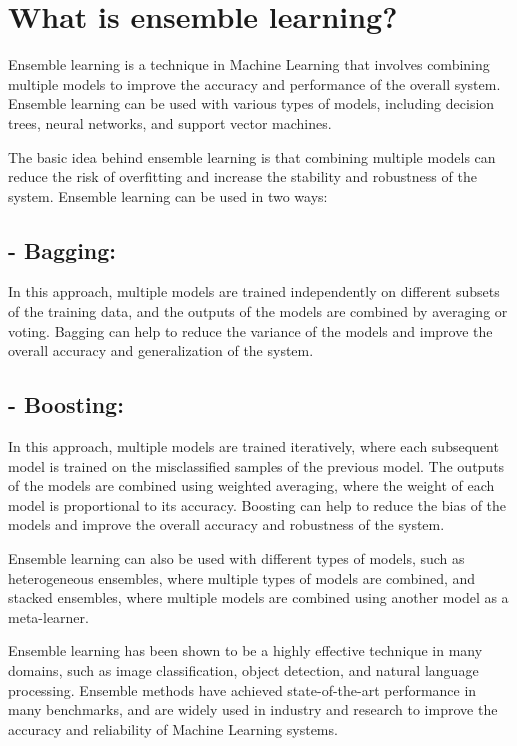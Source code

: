 \section{What is ensemble learning?}
Ensemble learning is a technique in Machine Learning that involves combining multiple models to improve the accuracy and performance of the overall system. Ensemble learning can be used with various types of models, including decision trees, neural networks, and support vector machines.

The basic idea behind ensemble learning is that combining multiple models can reduce the risk of overfitting and increase the stability and robustness of the system. Ensemble learning can be used in two ways:

\subsection{- Bagging:}  In this approach, multiple models are trained independently on different subsets of the training data, and the outputs of the models are combined by averaging or voting. Bagging can help to reduce the variance of the models and improve the overall accuracy and generalization of the system.

\subsection{- Boosting:}  In this approach, multiple models are trained iteratively, where each subsequent model is trained on the misclassified samples of the previous model. The outputs of the models are combined using weighted averaging, where the weight of each model is proportional to its accuracy. Boosting can help to reduce the bias of the models and improve the overall accuracy and robustness of the system.

Ensemble learning can also be used with different types of models, such as heterogeneous ensembles, where multiple types of models are combined, and stacked ensembles, where multiple models are combined using another model as a meta-learner.

Ensemble learning has been shown to be a highly effective technique in many domains, such as image classification, object detection, and natural language processing. Ensemble methods have achieved state-of-the-art performance in many benchmarks, and are widely used in industry and research to improve the accuracy and reliability of Machine Learning systems.

